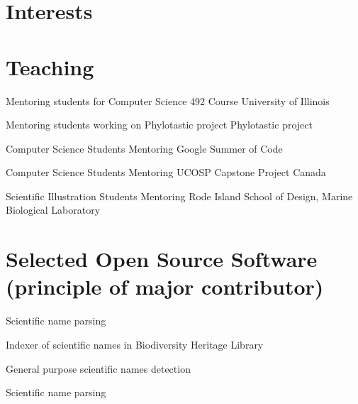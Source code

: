 \documentclass[11pt,letterpaper,sans]{moderncv} %
\begin{document}

\section{Interests}

\renewcommand{\listitemsymbol}{-~} %


\section{Teaching}

{Mentoring students for Computer Science 492 Course}
{University of Illinois}

{Mentoring students working on Phylotastic project}
{Phylotastic project}

{Computer Science Students Mentoring}
{Google Summer of Code}

{Computer Science Students Mentoring}
{UCOSP Capstone Project Canada}

{Scientific Illustration Students Mentoring}
{Rode Island School of Design, Marine Biological Laboratory}

\section{Selected Open Source Software (principle of major contributor)}

{}{Scientific name parsing}

{}{Indexer of scientific names in Biodiversity Heritage Library}

{}{General purpose scientific names detection}

{}{Scientific name parsing}
\end{document}
